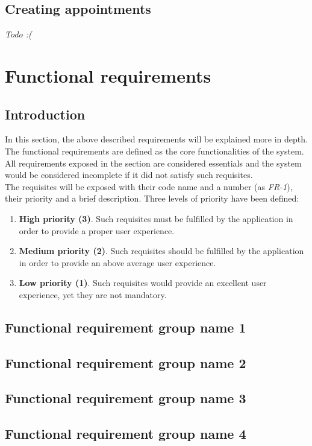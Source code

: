 \documentclass[a4paper,12pt]{book}
\begin{document}
\subsection{Creating appointments}
\emph{Todo :(}
\section{Functional requirements}
\subsection{Introduction}
In this section, the above described requirements will be explained more in depth. The functional requirements are defined as the core functionalities of the system. All requirements exposed in the section are considered essentials and the system would be considered incomplete if it did not satisfy such requisites.
\\[8pt]
The requisites will be exposed with their code name and a number (as \emph{FR-1}), their priority and a brief description. Three levels of priority have been defined:
\begin{enumerate}[label = \arabic{*}.]
	\item \textbf{High priority (3)}. Such requisites must be fulfilled by the application in order to provide a proper user experience.
	\item \textbf{Medium priority (2)}. Such requisites should be fulfilled by the application in order to provide an above average user experience.
	\item \textbf{Low priority (1)}. Such requisites would provide an excellent user experience, yet they are not mandatory.
\end{enumerate}
\subsection{Functional requirement group name 1}
\subsection{Functional requirement group name 2}
\subsection{Functional requirement group name 3}
\subsection{Functional requirement group name 4}
\end{document}
